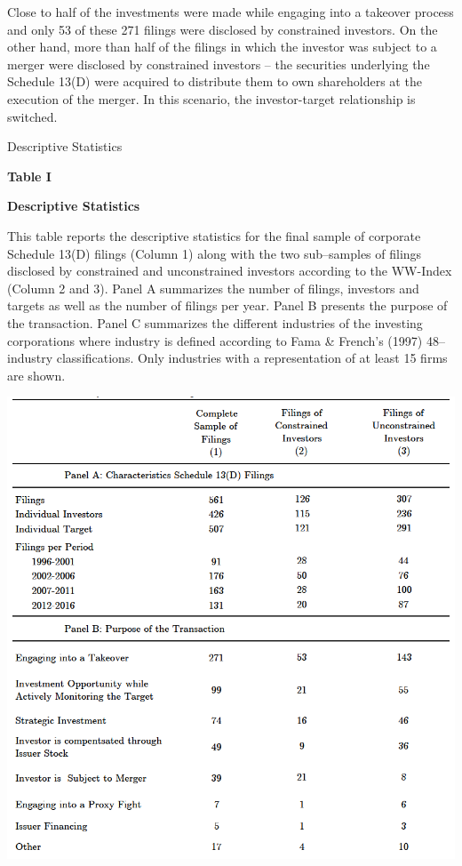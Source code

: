 \documentclass[12pt]{article}
\begin{document}
Close to half of the investments were made while engaging into a takeover process and only 53 of these 271 filings were disclosed by constrained investors. On the other hand, more than half of the filings in which the investor was subject to a merger were disclosed by constrained investors -- the securities underlying the Schedule 13(D) were acquired to distribute them to own shareholders at the execution of the merger. In this scenario, the investor-target relationship is switched.
\begin{table}[!htbp]
	\centering
	\captionsetup{textformat=empty,labelformat=blank}
	\caption{Descriptive Statistics}
	\textbf{Table I}\par\medskip
	\large\textbf{Descriptive Statistics}\par\medskip
	\justifying
	\footnotesize\noindent{}This table reports the descriptive statistics for the final sample of corporate Schedule 13(D) filings (Column 1) along with the two sub–samples of filings disclosed by constrained and unconstrained investors according to the WW-Index (Column 2 and 3). Panel A summarizes the number of filings, investors and targets as well as the number of filings per year. Panel B presents the purpose of the transaction. Panel C summarizes the different industries of the investing corporations where industry is defined according to Fama \& French’s (1997) 48–industry classifications. Only industries with a representation of at least 15 firms are shown.\par\medskip
	\centering													
	\begin{adjustbox}{width=\textwidth}
		\includegraphics{descriptive1final}
	\end{adjustbox}\par\medskip
\end{table}
\end{document}
